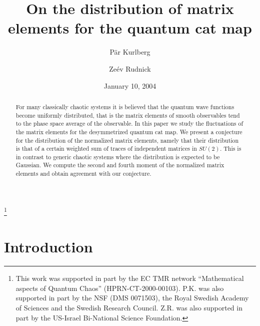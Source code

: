 \documentclass[12pt]{amsart}
\theoremstyle{plain}
\renewcommand{\^}{\widehat}
\begin{document}
\title[Matrix elements for quantum cat maps]
{On  the distribution of matrix elements for the  
quantum cat map}

\date{January 10, 2004}

%
\begin{abstract}
For  many classically chaotic systems it is believed that the 
quantum wave functions become uniformly distributed,  
that is the matrix elements of smooth observables
tend to the phase space average of the observable. 
In this paper we study the fluctuations of the matrix elements 
for the desymmetrized quantum cat map.  
We present a conjecture for the distribution of the normalized
matrix elements, namely that their distribution is that of a certain
weighted sum of traces of independent matrices in $SU(2)$. 
This is in contrast to  generic chaotic systems where the distribution
is expected to be Gaussian. 
We compute the second and fourth moment of the normalized
matrix elements and obtain agreement with our conjecture. 
\end{abstract}


\thanks{
This work was supported in part by  the EC TMR network 
``Mathematical aspects of Quantum Chaos'' %
(HPRN-CT-2000-00103). 
P.K. was also supported in part by the NSF (DMS 0071503), the Royal Swedish
Academy of Sciences and the Swedish Research Council. 
Z.R. was also supported in part by the US-Israel Bi-National Science
Foundation.}


\author{P\"ar Kurlberg}
\address{
Department of Mathematics\\ 
Chalmers University of Technology\\
SE-412 96 Gothenburg  \\
Sweden}

\author{Ze\'ev Rudnick}
\address{Raymond and Beverly Sackler School of Mathematical Sciences,
Tel Aviv University, Tel Aviv 69978, Israel}



\maketitle

\section{Introduction}
\end{document}
